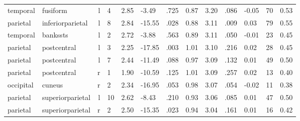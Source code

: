 \documentclass{article}
\begin{document}
\begin{longtable}{llrR{1.3cm}R{1cm}R{1.3cm}R{1cm}R{1cm}R{1.3cm}R{1cm}R{1.8cm}R{1.3cm}R{1.8cm}}
  temporal &                  fusiform &    l &         4 &                  2.85 &            -3.49 &               .725 &                               0.87 &                          3.20 &                            .086 &  -0.05 &     70 &      0.53 \\
  parietal &          inferiorparietal &    l &         8 &                  2.84 &           -15.55 &               .028 &                               0.88 &                          3.11 &                            .009 &   0.03 &     79 &      0.55 \\
  temporal &                  bankssts &    l &         2 &                  2.72 &            -3.88 &               .563 &                               0.89 &                          3.11 &                            .050 &  -0.01 &     23 &      0.45 \\
  parietal &               postcentral &    l &         3 &                  2.25 &           -17.85 &               .003 &                               1.01 &                          3.10 &                            .216 &   0.02 &     28 &      0.45 \\
  parietal &               postcentral &    l &         7 &                  2.44 &           -11.49 &               .088 &                               0.97 &                          3.09 &                            .132 &   0.01 &     49 &      0.50 \\
  parietal &               postcentral &    r &         1 &                  1.90 &           -10.59 &               .125 &                               1.01 &                          3.09 &                            .257 &   0.02 &     13 &      0.40 \\
 occipital &                    cuneus &    r &         2 &                  2.34 &           -16.95 &               .053 &                               0.98 &                          3.07 &                            .054 &  -0.02 &     11 &      0.38 \\
  parietal &          superiorparietal &    l &        10 &                  2.62 &            -8.43 &               .210 &                               0.93 &                          3.06 &                            .085 &   0.01 &     47 &      0.50 \\
  parietal &          superiorparietal &    r &         2 &                  2.50 &           -15.35 &               .023 &                               0.94 &                          3.04 &                            .161 &   0.01 &     16 &      0.42 \\

\end{longtable}
\end{document}
